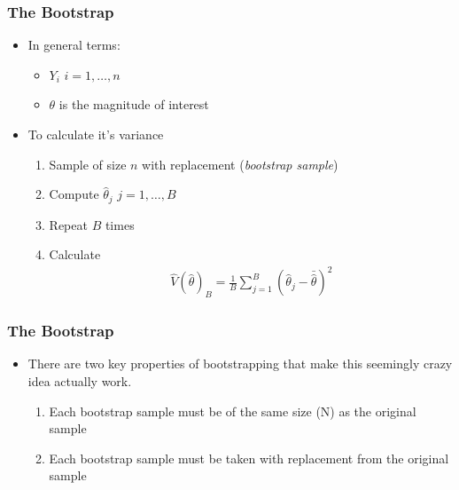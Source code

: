 \documentclass[
  shownotes,
  xcolor={svgnames},
  hyperref={colorlinks,citecolor=DarkBlue,linkcolor=andesred,urlcolor=DarkBlue}
  , aspectratio=169]{beamer}
\begin{document}
\begin{frame}[fragile]
\frametitle{The Bootstrap}


\begin{itemize}
  \item In general terms:
    \begin{itemize}
      \item $Y_i$ $i=1,\dots,n$
      \item $\theta$ is the magnitude of interest
    \end{itemize}
    \item To calculate it's variance
   \begin{enumerate}
    \item Sample of size $n$ with replacement ({\it bootstrap sample})
    \medskip
    \item Compute $\hat{\theta}_j$ $j=1,\dots,B$
    \medskip
    \item Repeat $B$ times
    \medskip
    \item Calculate
    \begin{align}
    \hat{V}(\hat{\theta})_B =\frac{1}{B}\sum_{j=1}^B (\hat{\theta}_j- \bar{\hat{\theta}})^2
    \end{align}
   \end{enumerate}
  \medskip


\end{itemize}


 \end{frame}
\begin{frame}[fragile]
\frametitle{The Bootstrap}


\begin{itemize}

  \item There are two key properties of bootstrapping that make this seemingly crazy idea actually work. 
  \medskip
  \begin{enumerate}
  \item Each bootstrap sample must be of the same size (N) as the original sample
  \medskip
  \item Each bootstrap sample must be taken with replacement from the original sample
\end{enumerate}

\end{itemize}
 \end{frame}
\end{document}
